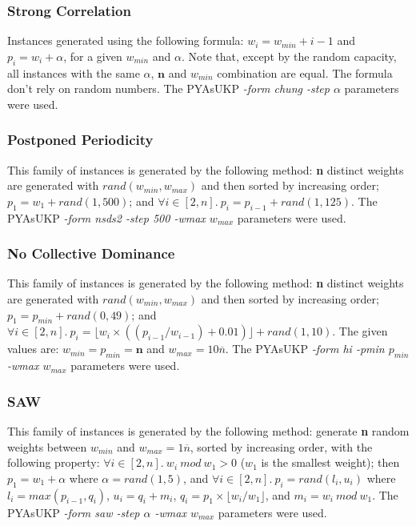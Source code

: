 \documentclass[runningheads,a4paper]{llncs}
\begin{document}
\subsubsection{Strong Correlation}
Instances generated using the following formula: \(w_i = w_{min} + i - 1\) and \(p_i = w_i + \alpha\), for a given \(w_{min}\) and \(\alpha\).  Note that, except by the random capacity, all instances with the same \(\alpha\), \(\mathbf{n}\) and \(w_{min}\) combination are equal. The formula don't rely on random numbers. The PYAsUKP \emph{-form chung -step \(\alpha\) } parameters were used.

\subsubsection{Postponed Periodicity}
This family of instances is generated by the following method: \textbf{n} distinct weights are generated with \(rand(w_{min}, w_{max})\) and then sorted by increasing order; \(p_1 = w_1 + rand(1, 500)\); and \(\forall i \in [2, n].~p_i = p_{i-1} + rand(1, 125)\). The PYAsUKP \emph{-form nsds2 -step 500 -wmax \(w_{max}\)} parameters were used.

\subsubsection{No Collective Dominance}
This family of instances is generated by the following method: \textbf{n} distinct weights are generated with \(rand(w_{min}, w_{max})\) and then sorted by increasing order; \(p_1 = p_{min} + rand(0, 49)\); and \(\forall i \in [2, n].~p_i = \lfloor w_i \times ((p_{i-1}/w_{i-1}) + 0.01)\rfloor + rand(1, 10)\). The given values are: \(w_{min} = p_{min} = \mathbf{n}\) and \(w_{max} = 10\overline{n}\). The PYAsUKP \emph{-form hi -pmin \(p_{min}\) -wmax \(w_{max}\)} parameters were used.

\subsubsection{SAW}
This family of instances is generated by the following method: generate \textbf{n} random weights between \(w_{min}\) and \(w_{max} = 1\overline{n}\), sorted by increasing order, with the following property: \(\forall i \in [2, n].~w_i~mod~w_1 > 0\) (\(w_1\) is the smallest weight); then \(p_1 = w_1 + \alpha\) where \(\alpha = rand(1,5)\), and \(\forall i \in [2, n].~p_i = rand(l_i, u_i)\) where \(l_i = max(p_{i-1}, q_i)\), \(u_i = q_i + m_i\), \(q_i = p_1 \times \lfloor w_i / w_1 \rfloor \), and \(m_i = w_i~mod~w_1\). The PYAsUKP \emph{-form saw -step \(\alpha\) -wmax \(w_{max}\)} parameters were used.
\end{document}
